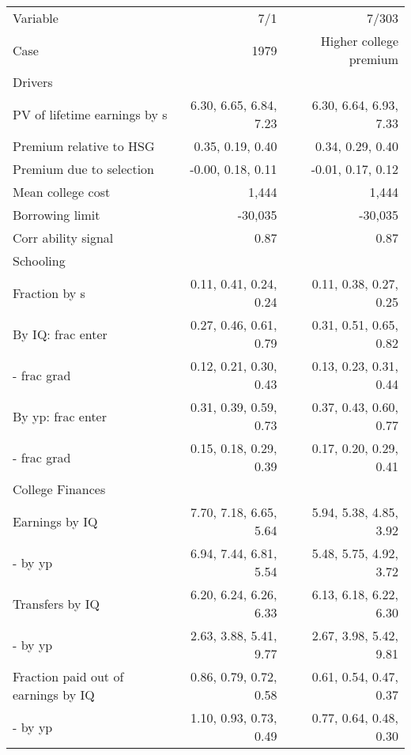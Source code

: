 \begin{tabular}{lrr}
\hline
Variable & 7/1  & 7/303  \\ 
Case & 1979  & Higher college premium  \\ 
Drivers &   &   \\ 
PV of lifetime earnings by s & 6.30, 6.65, 6.84, 7.23  & 6.30, 6.64, 6.93, 7.33  \\ 
Premium relative to HSG & 0.35, 0.19, 0.40  & 0.34, 0.29, 0.40  \\ 
Premium due to selection & -0.00, 0.18, 0.11  & -0.01, 0.17, 0.12  \\ 
Mean college cost & 1,444  & 1,444  \\ 
Borrowing limit & -30,035  & -30,035  \\ 
Corr ability signal & 0.87  & 0.87  \\ 
\hline
Schooling &   &   \\ 
Fraction by s & 0.11, 0.41, 0.24, 0.24  & 0.11, 0.38, 0.27, 0.25  \\ 
By IQ: frac enter & 0.27, 0.46, 0.61, 0.79  & 0.31, 0.51, 0.65, 0.82  \\ 
- frac grad & 0.12, 0.21, 0.30, 0.43  & 0.13, 0.23, 0.31, 0.44  \\ 
By yp: frac enter & 0.31, 0.39, 0.59, 0.73  & 0.37, 0.43, 0.60, 0.77  \\ 
- frac grad & 0.15, 0.18, 0.29, 0.39  & 0.17, 0.20, 0.29, 0.41  \\ 
\hline
College Finances &   &   \\ 
Earnings by IQ & 7.70, 7.18, 6.65, 5.64  & 5.94, 5.38, 4.85, 3.92  \\ 
- by yp & 6.94, 7.44, 6.81, 5.54  & 5.48, 5.75, 4.92, 3.72  \\ 
Transfers by IQ & 6.20, 6.24, 6.26, 6.33  & 6.13, 6.18, 6.22, 6.30  \\ 
- by yp & 2.63, 3.88, 5.41, 9.77  & 2.67, 3.98, 5.42, 9.81  \\ 
Fraction paid out of earnings by IQ & 0.86, 0.79, 0.72, 0.58  & 0.61, 0.54, 0.47, 0.37  \\ 
- by yp & 1.10, 0.93, 0.73, 0.49  & 0.77, 0.64, 0.48, 0.30  \\ 
\hline
\end{tabular}%
